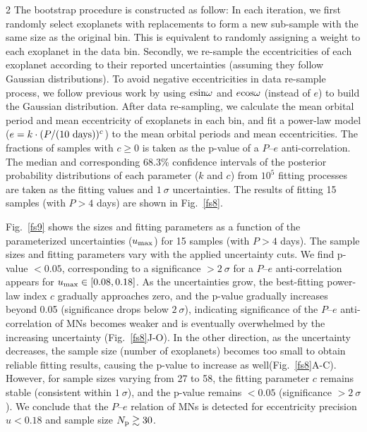 \documentclass[10pt]{article}
\begin{document}
\begin{multicols}{2}
The bootstrap procedure is constructed as follow:
In each iteration, we first randomly select exoplanets with replacements to form a new sub-sample with the same size as the original bin.
This is equivalent to randomly assigning a weight to each exoplanet in the data bin.
Secondly, we re-sample the eccentricities of each exoplanet according to their reported uncertainties (assuming they follow Gaussian distributions).
To avoid negative eccentricities in data re-sample process, we follow previous work\cite{2017A&A...605A..72L} by using $e{\rm sin}\omega$ and $e{\rm cos}\omega$ (instead of $e$) to build the Gaussian distribution.
After data re-sampling, we calculate the mean orbital period and mean eccentricity of exoplanets in each bin, and fit a power-law model ($e = k\cdot(P/(10~{\rm days)})^c$) to the mean orbital periods and mean eccentricities.
The fractions of samples with $c\geq0$ is taken as the p-value of a $P$--$e$ anti-correlation.
The median and corresponding 68.3\% confidence intervals of the posterior probability distributions of each parameter ($k$ and $c$) from $10^5$ fitting processes are taken as the fitting values and $1~\sigma$ uncertainties.
The results of fitting 15 samples (with $P>4$ days) are shown in Fig.~\ref{fs8}.

Fig.~\ref{fs9} shows the sizes and fitting parameters as a function of the parameterized uncertainties ($u_{\rm max}$) for 15 samples (with $P>4$ days).
The sample sizes and fitting parameters vary with the applied uncertainty cuts.
We find p-value $<0.05$, corresponding to a significance $>2~\sigma$  for a $P$--$e$ anti-correlation appears for $u_{\rm max}\in[0.08,0.18]$.
As the uncertainties grow, the best-fitting power-law index $c$ gradually approaches zero, and the p-value gradually increases beyond 0.05 (significance drops below $2~\sigma$), indicating significance of the $P$--$e$ anti-correlation of MNs becomes weaker and is eventually overwhelmed by the increasing uncertainty (Fig.~\ref{fs8}J-O).
In the other direction, as the uncertainty decreases, the sample size (number of exoplanets) becomes too small to obtain reliable fitting results, causing the p-value to increase as well(Fig.~\ref{fs8}A-C).
However, for sample sizes varying from 27 to 58, the fitting parameter $c$ remains stable (consistent within $1~\sigma$), and the p-value remains $<0.05$ (significance $>2~\sigma$).
We conclude that the $P$--$e$ relation of MNs is detected for eccentricity precision $u < 0.18$ and sample size $N_{\rm p} \gtrsim 30$.
\end{multicols}
\end{document}
